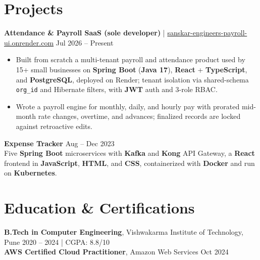 \documentclass[letterpaper,10pt]{article}
\begin{document}
\section*{Projects}

\textbf{Attendance \& Payroll SaaS (sole developer)} \;|\; \href{https://sanskar-engineers-payroll-ui.onrender.com}{sanskar-engineers-payroll-ui.onrender.com} \hfill Jul 2026 -- Present
\begin{itemize}
    \item Built from scratch a multi-tenant payroll and attendance product used by 15+ small businesses on \textbf{Spring Boot} (\textbf{Java 17}), \textbf{React} + \textbf{TypeScript}, and \textbf{PostgreSQL}, deployed on Render; tenant isolation via shared-schema \texttt{org\_id} and Hibernate filters, with \textbf{JWT} auth and 3-role RBAC.
    \item Wrote a payroll engine for monthly, daily, and hourly pay with prorated mid-month rate changes, overtime, and advances; finalized records are locked against retroactive edits.
\end{itemize}

\textbf{Expense Tracker} \hfill Aug -- Dec 2023 \\
Five \textbf{Spring Boot} microservices with \textbf{Kafka} and \textbf{Kong} API Gateway, a \textbf{React} frontend in \textbf{JavaScript}, \textbf{HTML}, and \textbf{CSS}, containerized with \textbf{Docker} and run on \textbf{Kubernetes}.

\section*{Education \& Certifications}
\textbf{B.Tech in Computer Engineering}, Vishwakarma Institute of Technology, Pune \hfill 2020 -- 2024 \;|\; CGPA: 8.8/10 \\
\textbf{AWS Certified Cloud Practitioner}, Amazon Web Services \hfill Oct 2024
\end{document}
